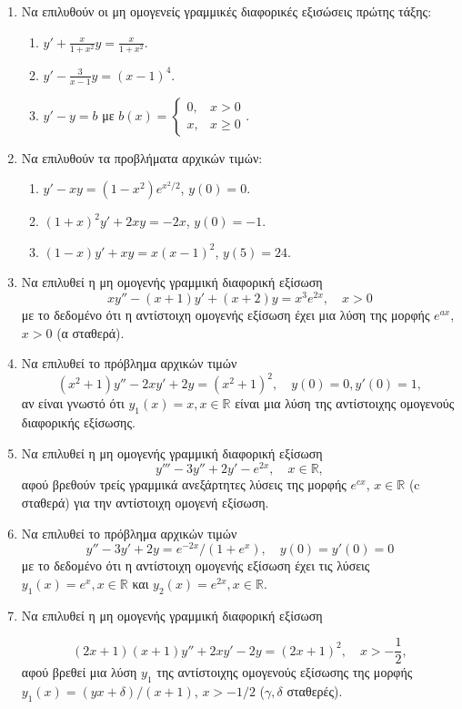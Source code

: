 \documentclass[11pt,a4paper,twoside]{book}
\begin{document}
\begin{enumerate}
    \item Να επιλυθούν οι μη ομογενείς γραμμικές διαφορικές εξισώσεις πρώτης τάξης:
    \begin{enumerate}
        \item $y' + \frac{x}{1+x^2} y = \frac{x}{1+x^2}$.
        \item $y' - \frac{3}{x-1}y = (x-1)^4$.
        \item $y' - y = b$ με $b(x) = \begin{cases} 0, & x>0 \\ x, & x\geq 0 \end{cases}$.
    \end{enumerate}
    \item Να επιλυθούν τα προβλήματα αρχικών τιμών:
    \begin{enumerate}
        \item $y'-xy=(1-x^2)e^{x^2/2}$, $y(0)=0$.
        \item $(1+x)^2y'+2xy=-2x$, $y(0)=-1$.
        \item $(1-x)y'+xy=x(x-1)^2$, $y(5)=24$.
    \end{enumerate}
    \item Να επιλυθεί η μη ομογενής γραμμική διαφορική εξίσωση
    \[
        xy'' - (x+1)y' + (x+2)y = x^3e^{2x}, \quad x>0
    \]
    με το δεδομένο ότι η αντίστοιχη ομογενής εξίσωση έχει μια λύση της μορφής $e^{ax}$, $x>0$ (α σταθερά).
    
    \item Να επιλυθεί το πρόβλημα αρχικών τιμών
    \[
        (x^2+1)y'' - 2xy' + 2y = (x^2+1)^2, \quad y(0)=0, y'(0)=1,
    \]
    αν είναι γνωστό ότι $y_1(x)=x, x\in\mathbb{R}$ είναι μια λύση της αντίστοιχης ομογενούς διαφορικής εξίσωσης.
    
    \item Να επιλυθεί η μη ομογενής γραμμική διαφορική εξίσωση
    \[
        y''' - 3y'' + 2y' - e^{2x}, \quad x\in\mathbb{R},
    \]
    αφού βρεθούν τρείς γραμμικά ανεξάρτητες λύσεις της μορφής $e^{cx}$, $x\in\mathbb{R}$ (c σταθερά) για την αντίστοιχη ομογενή εξίσωση.
    
    \item Να επιλυθεί το πρόβλημα αρχικών τιμών
    \[
        y'' - 3y' + 2y = e^{-2x}/(1+e^x), \quad y(0)=y'(0)=0
    \]
    με το δεδομένο ότι η αντίστοιχη ομογενής εξίσωση έχει τις λύσεις $y_1(x)=e^x, x\in\mathbb{R}$ και $y_2(x)=e^{2x}, x\in\mathbb{R}$.
    
    \item Να επιλυθεί η μη ομογενής γραμμική διαφορική εξίσωση




\[
    (2x+1)(x+1)y''+2xy'-2y=(2x+1)^2, \quad x>-\frac{1}{2},
\]
αφού βρεθεί μια λύση $y_1$ της αντίστοιχης ομογενούς εξίσωσης της μορφής $y_1(x)=(yx+\delta)/(x+1)$, $x>-1/2$ ($\gamma,\delta$ σταθερές).
\end{enumerate}
\end{document}
